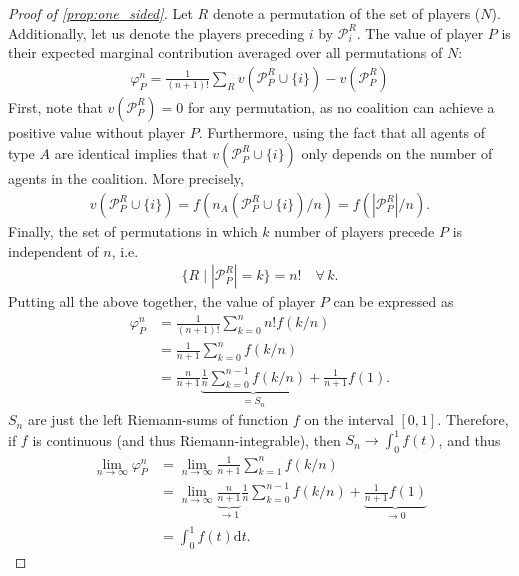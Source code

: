 \documentclass[a4paper]{article}
\newcommand{\dt}{\mathrm{d}t}
\begin{document}
\begin{proof}[Proof of \cref{prop:one_sided}]
    Let $R$ denote a permutation of the set of players ($N$).
    Additionally, let us denote the players preceding $i$ by $\mathcal{P}_i^R$.
    The value of player $P$ is their expected marginal contribution averaged over all permutations of $N$:
    \begin{align*}
        \varphi_P^n = \frac{1}{(n+1)!} \sum_R v(\mathcal{P}_P^R \cup \{i\}) - v(\mathcal{P}_P^R)
    \end{align*}
    First, note that $v(\mathcal{P}_P^R) = 0$ for any permutation, as no coalition can achieve a positive value without player $P$.
    Furthermore, using the fact that all agents of type $A$ are identical implies that $v(\mathcal{P}_P^R \cup \{i\})$ only depends on the number of agents in the coalition.
    More precisely, 
    \begin{align*}
        v(\mathcal{P}_P^R \cup \{i\}) = f(n_A(\mathcal{P}_P^R \cup \{i\}) / n) = f(|\mathcal{P}_P^R| / n).
    \end{align*}
    Finally, the set of permutations in which $k$ number of players precede $P$ is independent of $n$, i.e.
    \begin{align*}
        \{R \mid |\mathcal{P}_P^R| = k\} = n! \quad \forall\, k.
    \end{align*}
    Putting all the above together, the value of player $P$ can be expressed as
    \begin{align*}
        \varphi_P^n &= \frac{1}{(n+1)!} \sum_{k=0}^n n! f(k / n) \\
        &= \frac{1}{n+1} \sum_{k=0}^n f(k / n) \\
        &= \frac{n}{n+1} \underbrace{\frac{1}{n} \sum_{k=0}^{n-1} f(k / n)}_{=S_n} + \frac{1}{n+1} f(1).
    \end{align*}
    $S_n$ are just the left Riemann-sums of function $f$ on the interval $[0, 1]$.
    Therefore, if $f$ is continuous (and thus Riemann-integrable), then $S_n \to \int_0^1 f(t)$, and thus
    \begin{align*}
        \lim_{n \to \infty} \varphi_P^n &= \lim_{n \to \infty} \frac{1}{n+1} \sum_{k=1}^n f(k / n) \\
        &= \lim_{n \to \infty}\underbrace{\frac{n}{n+1}}_{\to 1} \frac{1}{n} \sum_{k=0}^{n-1} f(k / n) + \underbrace{\frac{1}{n+1} f(1)}_{\to 0} \\
        &= \int_0^1 f(t) \dt .
    \end{align*}
\end{proof}
\end{document}
